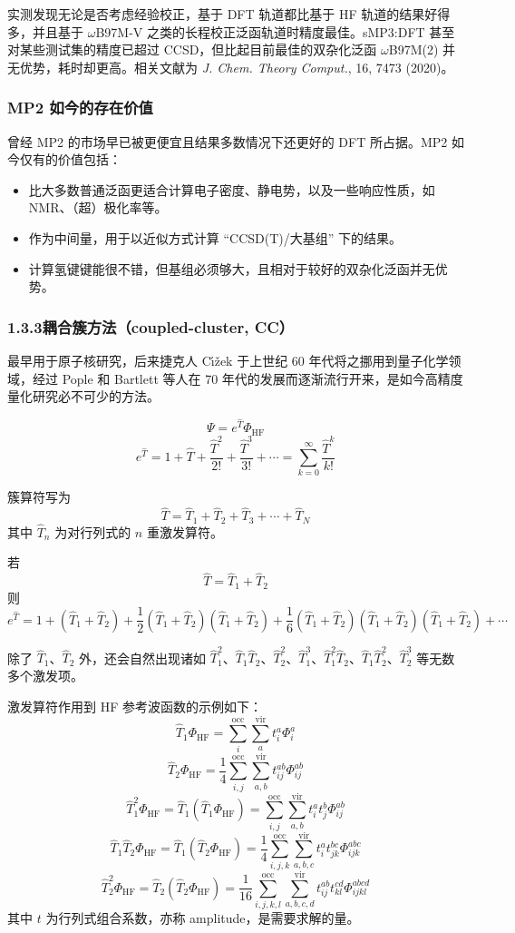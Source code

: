 实测发现无论是否考虑经验校正，基于 DFT 轨道都比基于 HF 轨道的结果好得多，并且基于 $\omega$B97M-V 之类的长程校正泛函轨道时精度最佳。sMP3:DFT 甚至对某些测试集的精度已超过 CCSD，但比起目前最佳的双杂化泛函 $\omega$B97M(2) 并无优势，耗时却更高。相关文献为 \textit{J. Chem. Theory Comput.}, 16, 7473 (2020)。

\subsubsection*{MP2 如今的存在价值}

曾经 MP2 的市场早已被更便宜且结果多数情况下还更好的 DFT 所占据。MP2 如今仅有的价值包括：
\begin{itemize}
  \item 比大多数普通泛函更适合计算电子密度、静电势，以及一些响应性质，如 NMR、（超）极化率等。
  \item 作为中间量，用于以近似方式计算 “CCSD(T)/大基组” 下的结果。
  \item 计算氢键键能很不错，但基组必须够大，且相对于较好的双杂化泛函并无优势。
\end{itemize}

\subsubsection*{1.3.3\quad 耦合簇方法（coupled-cluster, CC）}

最早用于原子核研究，后来捷克人 C{\'\i}\v zek 于上世纪 60 年代将之挪用到量子化学领域，经过 Pople 和 Bartlett 等人在 70 年代的发展而逐渐流行开来，是如今高精度量化研究必不可少的方法。

\[
\Psi=e^{\hat T}\Phi_{\mathrm{HF}}
\]
\[
e^{\hat T}
=
1+\hat T+\frac{\hat T^2}{2!}+\frac{\hat T^3}{3!}+\cdots
=
\sum_{k=0}^{\infty}\frac{\hat T^k}{k!}
\]

簇算符写为
\[
\hat T=\hat T_1+\hat T_2+\hat T_3+\cdots+\hat T_N
\]
其中 $\hat T_n$ 为对行列式的 $n$ 重激发算符。

若
\[
\hat T=\hat T_1+\hat T_2
\]
则
\[
e^{\hat T}
=
1+(\hat T_1+\hat T_2)
+
\frac{1}{2}(\hat T_1+\hat T_2)(\hat T_1+\hat T_2)
+
\frac{1}{6}(\hat T_1+\hat T_2)(\hat T_1+\hat T_2)(\hat T_1+\hat T_2)
+\cdots
\]

除了 $\hat T_1$、$\hat T_2$ 外，还会自然出现诸如 $\hat T_1^2$、$\hat T_1\hat T_2$、$\hat T_2^2$、$\hat T_1^3$、$\hat T_1^2\hat T_2$、$\hat T_1\hat T_2^2$、$\hat T_2^3$ 等无数多个激发项。

激发算符作用到 HF 参考波函数的示例如下：
\[
\hat T_1\Phi_{\mathrm{HF}}
=
\sum_i^{\mathrm{occ}}\sum_a^{\mathrm{vir}} t_i^a \Phi_i^a
\]
\[
\hat T_2\Phi_{\mathrm{HF}}
=
\frac{1}{4}\sum_{i,j}^{\mathrm{occ}}\sum_{a,b}^{\mathrm{vir}} t_{ij}^{ab}\Phi_{ij}^{ab}
\]
\[
\hat T_1^2\Phi_{\mathrm{HF}}
=
\hat T_1(\hat T_1\Phi_{\mathrm{HF}})
=
\sum_{i,j}^{\mathrm{occ}}\sum_{a,b}^{\mathrm{vir}} t_i^a t_j^b \Phi_{ij}^{ab}
\]
\[
\hat T_1\hat T_2\Phi_{\mathrm{HF}}
=
\hat T_1(\hat T_2\Phi_{\mathrm{HF}})
=
\frac{1}{4}\sum_{i,j,k}^{\mathrm{occ}}\sum_{a,b,c}^{\mathrm{vir}} t_i^a t_{jk}^{bc}\Phi_{ijk}^{abc}
\]
\[
\hat T_2^2\Phi_{\mathrm{HF}}
=
\hat T_2(\hat T_2\Phi_{\mathrm{HF}})
=
\frac{1}{16}\sum_{i,j,k,l}^{\mathrm{occ}}\sum_{a,b,c,d}^{\mathrm{vir}} t_{ij}^{ab}t_{kl}^{cd}\Phi_{ijkl}^{abcd}
\]
其中 $t$ 为行列式组合系数，亦称 amplitude，是需要求解的量。

